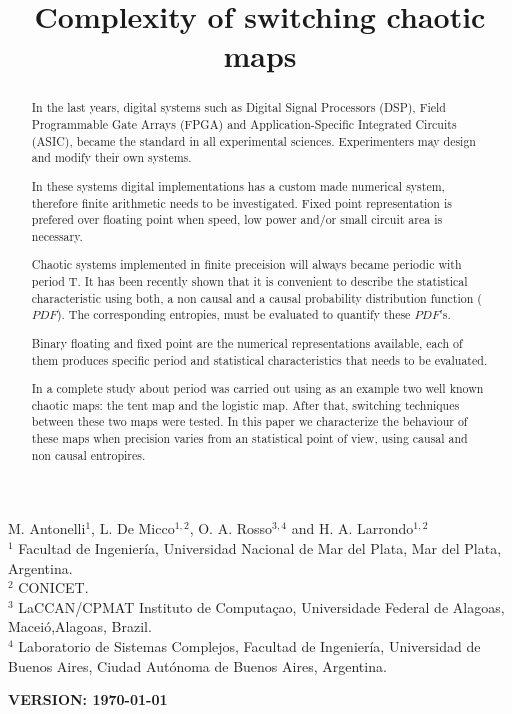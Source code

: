 \begin{frontmatter}

	\title{Complexity of switching chaotic maps}
	M. Antonelli$^{1}$, L. De Micco$^{1,2}$, O. A. Rosso$^{3,4}$ and H. A. Larrondo$^{1,2}$\\
	$^{1}$ Facultad de Ingenier\'ia, Universidad Nacional de Mar del Plata, Mar del Plata, Argentina.\\
	$^{2}$ CONICET.\\
	$^{3}$ LaCCAN/CPMAT Instituto de Computa\c{c}ao, Universidade Federal de Alagoas, Macei\'o,Alagoas, Brazil.\\
	$^{4}$ Laboratorio de Sistemas Complejos, Facultad de
	Ingenier\'ia, Universidad de Buenos Aires, Ciudad Aut\'onoma de
	Buenos Aires, Argentina.\\

\begin{abstract}
In the last years, digital systems such as Digital Signal Processors (DSP), Field Programmable Gate Arrays (FPGA) and Application-Specific Integrated Circuits (ASIC), became the standard in all experimental sciences.
Experimenters may design and modify their own systems.

In these systems digital implementations has a custom made numerical system, therefore finite arithmetic needs to be investigated.
Fixed point representation is prefered over floating point when  speed, low power and/or small circuit area is necessary.

Chaotic systems implemented in finite preceision will always became periodic with period T.
It has been recently shown that it is convenient to describe the statistical characteristic using both, a non causal and a causal probability distribution function ($PDF$).
The corresponding entropies, must be evaluated to quantify these $PDF$'s.  

Binary floating and fixed point are the numerical representations available, each of them produces specific period and statistical characteristics that needs to be evaluated.

In \cite{Nagaraj2008} a complete study about period was carried out using as an example two well known chaotic maps: the tent map and the logistic map. After that, switching techniques between these two maps were tested.
In this paper we characterize the behaviour of these maps when precision varies from an statistical point of view, using causal and non causal entropires.

\end{abstract}
\maketitle
\end{frontmatter}
{\bf VERSION: \today}